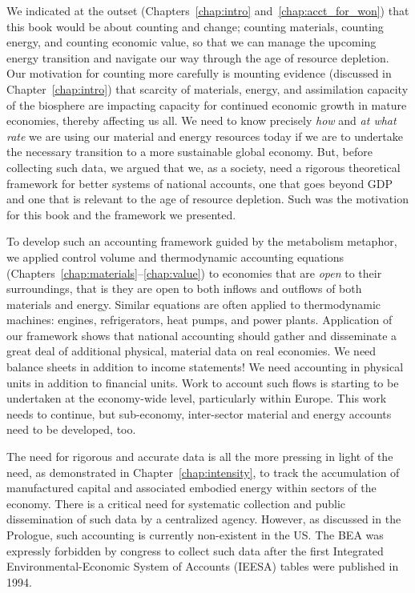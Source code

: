 We indicated at the outset (Chapters~\ref{chap:intro} and~\ref{chap:acct_for_won})
that this book would be about counting and change;
counting materials, counting energy, and counting economic value,
so that we can manage the upcoming energy transition
and navigate our way through the age of resource depletion.
Our motivation for counting more carefully
is mounting evidence (discussed in Chapter~\ref{chap:intro}) that 
scarcity of materials, energy, and 
assimilation capacity of the biosphere are impacting
capacity for continued economic growth in mature economies, 
thereby affecting us all.
We need to know precisely \emph{how} and \emph{at what rate} 
we are using our material and energy resources today
if we are to undertake the necessary transition to 
a more sustainable global economy.
But, before collecting such data,
we argued that we, as a society, 
need a rigorous theoretical framework for better systems of national accounts, 
one that goes beyond GDP and one that is relevant to the age of resource depletion.
Such was the motivation for this book and the framework we presented.

To develop such an accounting framework 
guided by the metabolism metaphor,
we applied control volume and thermodynamic accounting equations 
(Chapters~\ref{chap:materials}--\ref{chap:value})
to economies that are \emph{open} to their surroundings,
that is they are open to both inflows and outflows of both
materials and energy.
Similar equations are often applied to thermodynamic machines:
engines, refrigerators, heat pumps, and power plants.
Application of our framework shows that 
national accounting should gather and disseminate
a great deal of additional physical, material data on real economies.
We need balance sheets in addition to income statements!
We need accounting in physical units in addition to financial units.
Work to account such flows is starting to be
undertaken at the economy-wide level,
particularly within Europe.\cite{EUROSTAT2011}
This work needs to continue, 
but sub-economy, inter-sector material and energy 
accounts need to be developed, too.

The need for rigorous and accurate data
is all the more pressing in light of the need,
as demonstrated in Chapter~\ref{chap:intensity}, 
to track the accumulation 
of manufactured capital and associated embodied energy
within sectors of the economy.
There is a critical need for systematic
collection and public dissemination of such data 
by a centralized agency.
However,
as discussed in the Prologue, 
such accounting is currently non-existent in the US.
The BEA was expressly forbidden by congress 
to collect such data
after the first
Integrated Environmental-Economic System of Accounts (IEESA)
tables were published in 1994.

